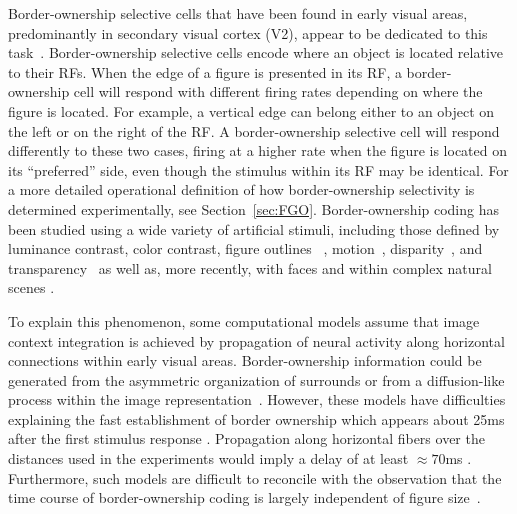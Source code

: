 Border-ownership selective cells that have been found in early visual
areas, predominantly in secondary visual cortex (V2), appear to be
dedicated to this task~\citep{Zhou_etal00}.  Border-ownership
selective cells encode where an object is located relative to their
RFs.  When the edge of a figure is presented in its RF, a
border-ownership cell will respond with different firing rates
depending on where the figure is located.  For example, a vertical
edge can belong either to an object on the left or on the right of the
RF. A border-ownership selective cell will respond differently to
these two cases, firing at a higher rate when the figure is located on
its ``preferred'' side, even though the stimulus within its RF may be
identical. For a more detailed operational definition of how
border-ownership selectivity is determined experimentally, see
Section~\ref{sec:FGO}. Border-ownership coding has been studied using
a wide variety of artificial stimuli, including those defined by
luminance contrast, color contrast, figure outlines ~\citep{Zhou_etal00}, 
motion~\citep{vonderHeydt_etal03a},
disparity~\citep{Zhou_etal00,Qiu_vonderHeydt05}, and
transparency~\citep{Qiu_vonderHeydt07} as well as, more recently, with
faces \citep{Hesse_Tsao16} and within complex natural scenes
\citep{Williford_vonderHeydt14}.

To explain this phenomenon, some computational models assume that
image context integration is achieved by propagation of neural
activity along horizontal connections within early visual
areas. Border-ownership information could be generated from the 
asymmetric organization of surrounds \citep{Nishimura_Sakai04,
 Nishimura_Sakai05,Sakai_etal12} or from a diffusion-like process
within the image representation~\citep{Grossberg94,Grossberg97,
Baek_Sajda05, Kikuchi_Akashi01, Pao_etal99,
Zhaoping05}. However, these models have difficulties explaining the
fast establishment of border ownership which appears about 25ms after
the first stimulus response \citep{Zhou_etal00}.
 Propagation along horizontal fibers over the
distances used in the experiments would imply a delay of at least $\approx70$ms \citep[][based on the conduction velocity of horizontal fibers in primate V1 cortex; we are not aware of corresponding data for V2]{Girard_etal01}. Furthermore, such models are difficult to reconcile with the observation that the time course of border-ownership coding is largely independent of figure size~\citep{Sugihara_etal11}.

